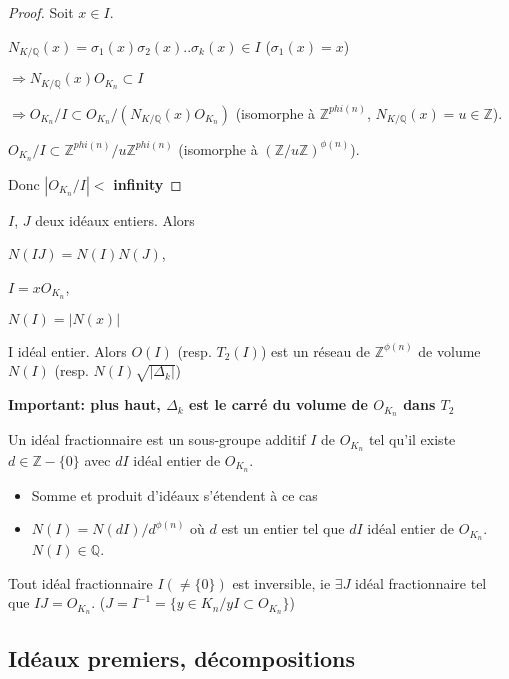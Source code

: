\begin{proof}
Soit $x \in I$.

$N_{K / \mathbb{Q}}(x)= \sigma_1(x) \sigma_2(x).. \sigma_k(x) \in I$ ($\sigma_1(x)=x$)

$\Rightarrow N_{K/\mathbb{Q}}(x) O_{K_n} \subset I$

$\Rightarrow O_{K_n}/I \subset O_{K_n}/ (N_{K/\mathbb{Q}}(x) O_{K_n})$ (isomorphe à $\mathbb{Z}^{phi(n)}$, $N_{K/\mathbb{Q}}(x)=u \in \mathbb{Z}$).

$O_{K_n}/I \subset \mathbb{Z}^{phi(n)}/u \mathbb{Z}^{phi(n)}$ (isomorphe à $(\mathbb{Z}/u \mathbb{Z})^{\phi(n)}$).

Donc $|O_{K_n}/I|<$ \textbf{infinity}
\end{proof}

\begin{proposition}
$I$, $J$ deux idéaux entiers. Alors 

$N(IJ)=N(I) N(J)$, 

$I=x O_{K_n}$, 

$N(I)=|N(x)|$
\end{proposition}

\begin{theorem}
I idéal entier. Alors $O(I)$ (resp. $T_2(I)$) est un réseau de $\mathbb{Z}^{\phi(n)}$ de volume $N(I)$ (resp. $N(I) \sqrt{|\Delta_k|}$)
\end{theorem}

\textbf{Important: plus haut, $\Delta_k$ est le carré du volume de $O_{K_n}$ dans $T_2$}

\begin{definition}
Un idéal fractionnaire est un sous-groupe additif $I$ de $O_{K_n}$ tel qu'il existe $d \in \mathbb{Z}-\{ 0 \}$ avec $d I$ idéal entier de $O_{K_n}$.
\begin{itemize}
\item Somme et produit d'idéaux s'étendent à ce cas
\item $N(I)=N(d I)/d^{\phi(n)}$ où $d$ est un entier tel que $dI$ idéal entier de $O_{K_n}$. $N(I) \in \mathbb{Q}$. 
\end{itemize}
\end{definition}

\begin{theorem}
Tout idéal fractionnaire $I (\neq \{ 0 \})$ est inversible, ie $\exists J$ idéal fractionnaire tel que $I J = O_{K_n}$. ($J=I^{-1}=\{y \in K_n / yI \subset O_{K_n} \}$)
\end{theorem}

\subsection{Idéaux premiers, décompositions}

